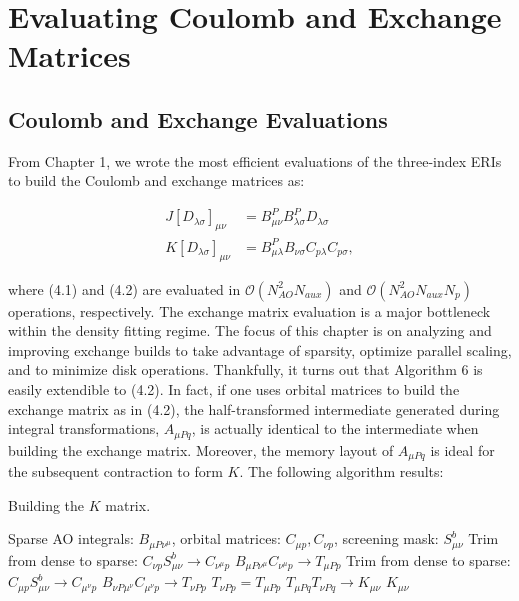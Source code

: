 \chapter{Evaluating Coulomb and Exchange Matrices}

\section{Coulomb and Exchange Evaluations}

From Chapter 1, we wrote the most efficient evaluations of the three-index ERIs to build the Coulomb and exchange matrices as:

\begin{align}
J[D_{\lambda \sigma}]_{\mu \nu} &= B_{\mu \nu}^P B_{\lambda \sigma}^PD_{\lambda \sigma} \\
K[D_{\lambda \sigma}]_{\mu \nu} &= B_{\mu \lambda}^P B_{\nu \sigma}C_{p\lambda}C_{p\sigma},
\end{align}

\noindent where (4.1) and (4.2) are evaluated in $\mathcal{O}(N_{AO}^2N_{aux})$ and $\mathcal{O}(N_{AO}^2N_{aux}N_p)$ operations, respectively.
The exchange matrix evaluation is a major bottleneck within the density fitting regime. The focus of this chapter is on analyzing and improving
exchange builds to take advantage of sparsity, optimize parallel scaling, and to minimize disk operations.
Thankfully, it turns out that Algorithm 6 is easily 
extendible to (4.2). In fact, if one uses orbital matrices to build the exchange matrix as in (4.2), the half-transformed 
intermediate generated during integral transformations, $A_{\mu Pq}$, is actually identical to the intermediate when building the exchange matrix. 
Moreover, the memory layout of $A_{\mu Pq}$ is ideal for the subsequent contraction to form $K$. The following algorithm results:

\begin{algorithm}[H]
\caption{Building the $K$ matrix.}
\begin{algorithmic}
\REQUIRE Sparse AO integrals: $B_{\mu P \nu^\mu}$, orbital matrices: $C_{\mu p}, C_{\nu p}$, screening mask: $S_{\mu \nu}^b$
    \STATE Trim from dense to sparse: $C_{\nu p}S_{\mu \nu}^b \rightarrow C_{\nu^{\mu} p}$
    \STATE $B_{\mu P \nu^{\mu}} C_{\nu^{\mu} p} \rightarrow T_{\mu Pp}$
        \STATE Trim from dense to sparse: $C_{\mu p}S_{\mu \nu}^b \rightarrow C_{\mu^{\nu} p}$
        \STATE $B_{\nu P \mu^{\nu}} C_{\mu^{\nu} p} \rightarrow T_{\nu P p}$
    \ELSE
        \STATE $T_{\nu P p} = T_{\mu P p}$ 
    \ENDIF
\ENDFOR
\STATE $T_{\mu P q} T_{\nu P q} \rightarrow K_{\mu \nu} $
\RETURN $K_{\mu \nu}$
\end{algorithmic}
\end{algorithm}

